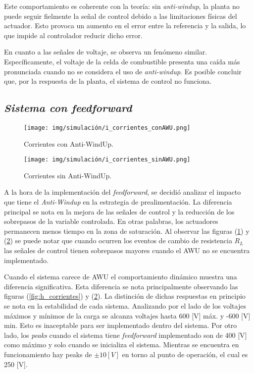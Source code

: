 Este comportamiento es coherente con la teoría: sin 
\textit{anti-windup}, la planta no puede seguir fielmente la señal de control debido a las limitaciones
físicas del actuador. Esto provoca un aumento en el error entre la referencia y la salida, 
lo que impide al controlador reducir dicho error.

En cuanto a las señales de voltaje, se observa un fenómeno similar. 
Específicamente, el voltaje de la celda de combustible presenta una 
caída más pronunciada cuando no se considera el uso de \textit{anti-windup}. Es posible concluir que, por la respuesta
de la planta, el sistema de control no funciona.
\subsection{\textit{Sistema con feedforward}}

\begin{figure}[H]
    \centering
    \texttt{[image: img/simulación/i\_corrientes\_conAWU.png]}
    \caption{Corrientes con Anti-WindUp.}
    \label{fig:i_corrientes_conAWU}
\end{figure}

\begin{figure}[H]
    \centering
    \texttt{[image: img/simulación/i\_corrientes\_sinAWU.png]}
    \caption{Corrientes sin Anti-WindUp.}
    \label{fig:i_corrientes_sinAWU}
\end{figure}

A la hora de la implementación del \textit{feedforward}, se decidió 
analizar el impacto que tiene el \textit{Anti-Windup} en la estrategia de prealimentación.
La diferencia principal se nota en la mejora de las señales de control y la reducción de los sobrepasos de la 
variable controlada. En otras palabras, los actuadores permanecen menos tiempo en la zona de saturación.
Al observar las figuras (\ref{fig:i_corrientes_conAWU}) y (\ref{fig:i_corrientes_sinAWU})
se puede notar que cuando ocurren los eventos de cambio de resistencia $R_L$ las señales de control
tienen sobrepasos mayores cuando el AWU no se encuentra implementado. 

Cuando el sistema carece de AWU el comportamiento dinámico 
muestra una diferencia significativa. Esta diferencia se nota principalmente observando las 
figuras (\ref{fig:h_corrientes}) y (\ref{fig:i_corrientes_sinAWU}).
La distinción de dichas respuestas en principio se nota en la estabilidad de cada sistema. Analizando por el lado de los
voltajes máximos y mínimos de la carga se alcanza voltajes hasta 600 [V] máx. y -600 [V] min. Esto es inaceptable
para ser implementado dentro del sistema. Por otro lado, los \textit{peaks} cuando el sistema tiene \textit{feedforward}
implementado son de 400 [V] como máximo y solo cuando se inicializa el sistema. Mientras se encuentra en funcionamiento
hay peaks de $\pm 10 [V]$ en torno al punto de operación, el cual es 250 [V].

